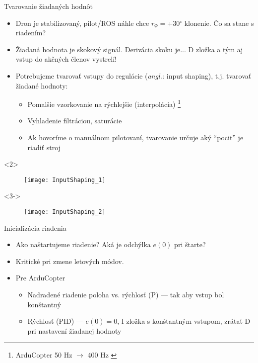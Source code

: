 \documentclass{beamer}
\newcommand{\angl}[1]{{\color{gray}(\emph{angl.:} #1)}}
\begin{document}
\begin{frame}[t]{Tvarovanie žiadaných hodnôt}
  \begin{itemize}
  \item<1-> Dron je stabilizovaný, pilot/ROS náhle chce $r_{\Phi}=$+30$^\circ$ klonenie. Čo sa stane s riadením?
  \item<2->  Žiadaná hodnota je skokový signál. Derivácia skoku je... D zložka a tým aj vstup do akčných členov vystrelí!
  \item<3->  Potrebujeme tvarovať vstupy do regulácie \angl{input shaping}, t.j. tvarovať žiadané hodnoty:
        \begin{itemize}
  \item Pomalšie vzorkovanie na rýchlejšie (interpolácia) \footnote{ArduCopter 50 Hz $\rightarrow$ 400 Hz \citep{AP:PID}}
  \item Vyhladenie filtráciou, saturácie
  \item<4-> Ak hovoríme o manuálnom pilotovaní, tvarovanie určuje aký ``pocit'' je riadiť stroj
  \end{itemize}
  \end{itemize}

        \begin{onlyenv}<2>
  \begin{figure}
\centering
  \texttt{[image: InputShaping\_1]}\\
\end{figure}
\end{onlyenv}


        \begin{onlyenv}<3->
  \begin{figure}
\centering
  \texttt{[image: InputShaping\_2]}\\
\end{figure}
\end{onlyenv}







\end{frame}

\begin{frame}[t]{Inicializácia riadenia}
\begin{itemize}
  \item<1-> Ako naštartujeme riadenie? Aká je odchýlka $e(0)$ pri štarte?
  \item<2-> Kritické pri zmene letových módov.
  \item<3-> Pre ArduCopter \cite{AP:PID}
    \begin{itemize}
    \item Nadradené riadenie poloha vs. rýchlosť (P) --- tak aby vstup bol konštantný
    \item Rýchlosť (PID) --- $e(0)=0$, I zložka s konštantným vstupom, zrátať D pri nastavení žiadanej hodnoty
\end{itemize}
\end{itemize}
\end{frame}
\end{document}
